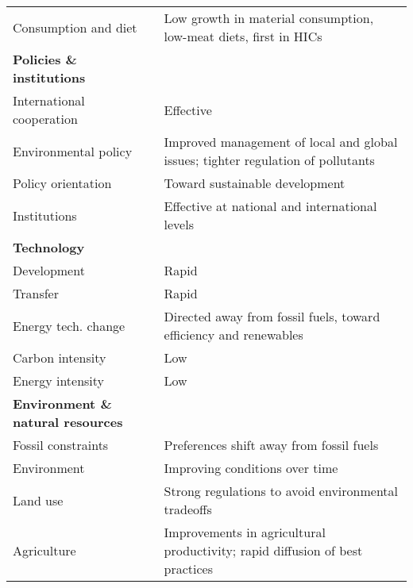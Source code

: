 {\begin{longtable}{p{5cm}p{9cm}}
Consumption and diet & Low growth in material consumption, low-meat diets, first in HICs \\
\textbf{Policies \& institutions} &  \\
International cooperation & Effective \\
Environmental policy & Improved management of local and global issues; tighter regulation of pollutants \\
Policy orientation & Toward sustainable development \\
Institutions & Effective at national and international levels \\ \addlinespace
\textbf{Technology} &  \\
Development & Rapid \\
Transfer & Rapid \\
Energy tech. change & Directed away from fossil fuels, toward efficiency and renewables \\
Carbon intensity & Low \\
Energy intensity & Low \\ \addlinespace
\textbf{Environment \& natural resources} &  \\
Fossil constraints & Preferences shift away from fossil fuels \\
Environment & Improving conditions over time \\
Land use & Strong regulations to avoid environmental tradeoffs \\
Agriculture & Improvements in agricultural productivity; rapid diffusion of best practices
\end{longtable}
}